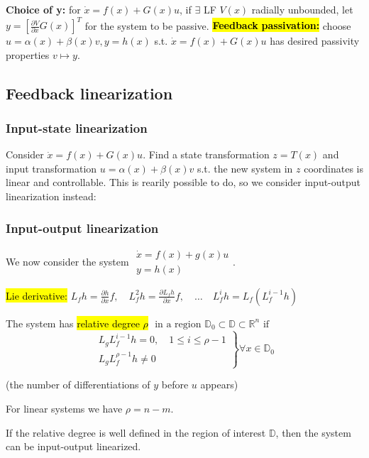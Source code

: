 \textbf{Choice of y:} for $\dot{x}=f(x)+G(x) u$, if $\exists$ LF $V(x)$ radially unbounded, let $y=\left[\frac{\partial V}{\partial x} G(x)\right]^{T}$ for the system to be passive.
\hl{\textbf{Feedback} \textbf{passivation:}} choose $u=\alpha(x)+\beta(x) v, y=h(x)$ s.t. $\dot{x}=f(x)+G(x) u$ has desired passivity properties $v \mapsto y$.

\subsection{Feedback linearization}
\subsubsection{Input-state linearization}
Consider $\dot{x}=f(x)+G(x) u$. Find a state transformation $z=T(x)$ and input transformation $u = \alpha(x) + \beta(x)v$ s.t. the new system in $z$ coordinates is linear and controllable.
This is rearily possible to do, so we consider input-output linearization instead:

\subsubsection{Input-output linearization}
We now consider the system $\begin{array}{l}{\dot{x}=f(x)+g(x) u} \\ {y=h(x)}\end{array}$.
\begin{definition}
    \hl{Lie derivative:} $L_{f} h=\frac{\partial h}{\partial x} f, \quad L_{f}^{2} h=\frac{\partial L_{f} h}{\partial x} f, \quad \dots \quad L_{f}^{i} h=L_{f}\left(L_{f}^{i-1} h\right)$
\end{definition}
\begin{definition}
    The system has \hl{relative degree $\rho$} $ \text { in a region } \mathbb{D}_{0} \subset \mathbb{D} \subset \mathbb{R}^{n} \text { if }$
    \begin{equation}
    \left.\begin{array}{l}{L_{g} L_{f}^{i-1} h=0, \quad 1 \leq i \leq \rho-1} \\ {L_{g} L_{f}^{\rho-1} h \neq 0}\end{array}\right\} \forall x \in \mathbb{D}_{0}
    \end{equation}
\end{definition}
\begin{remark}
    (the number of differentiations of $y$ before $u$ appears)
\end{remark}
\begin{remark}
    For linear systems we have $\rho = n-m$.
\end{remark}
\begin{remark}
    If the relative degree is well defined in the region of interest $\mathbb{D}$, then the system can be input-output linearized.
\end{remark}

